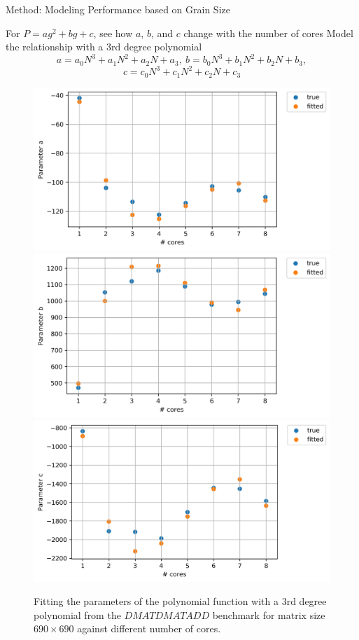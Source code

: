 \documentclass[10pt]{beamer}
\begin{document}
\begin{frame}{Method: Modeling Performance based on Grain Size}
	\begin{outline}	
		\1For $P=ag^2+bg+c$, see how $a$, $b$, and $c$ change with the number of cores
		\1Model the relationship with a 3rd degree polynomial
		$$a=a_0N^3+a_1N^2+a_2N+a_3
		,\:b=b_0N^3+b_1N^2+b_2N+b_3,$$ $$c=c_0N^3+c_1N^2+c_2N+c_3$$
		\begin{figure}[H]
			\centering
			{\includegraphics[scale=.2]{images/polyfit/fig_690_params_0.png}\label{fig15:a}}
			{\includegraphics[scale=.2]{images/polyfit/fig_690_params_1.png}\label{fig15:b}}
			{\includegraphics[scale=.2]{images/polyfit/fig_690_params_2.png}\label{fig15:c}}
			\caption{Fitting the parameters of the polynomial function with a $3$rd degree polynomial from the $DMATDMATADD$ benchmark for matrix size $690\times690$ against different number of cores.}	
			\label{fig15}
		\end{figure}
	\end{outline}
\end{frame}
\end{document}
